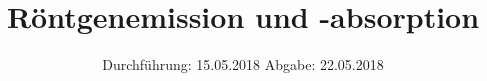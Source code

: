

\subject{Versuch 602}
\title{Röntgenemission und -absorption}
\date{%
  Durchführung: 15.05.2018
  \hspace{3em}
  Abgabe: 22.05.2018
}



\maketitle
\thispagestyle{empty}
\tableofcontents
\newpage






\printbibliography{}


